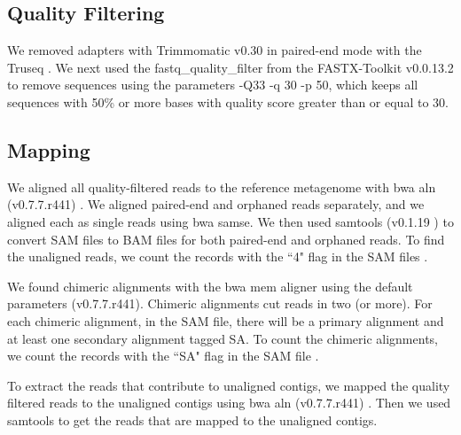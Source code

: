 \subsection*{Quality Filtering} 

We removed adapters with Trimmomatic v0.30 in paired-end mode with the
Truseq \cite{trim}.
We next used the fastq\_quality\_filter %
from the FASTX-Toolkit v0.0.13.2 \cite{FXtoolkit} to remove sequences  %
using the parameters -Q33 -q 30 -p 50, which keeps all sequences with 50\% or more bases with quality score greater than or equal to 30. %


\subsection*{Mapping}

We aligned all quality-filtered reads to the reference metagenome with bwa
aln (v0.7.7.r441) \cite{bwa}. %
  We aligned paired-end and orphaned reads separately,
and we aligned each as single reads using bwa samse.  We then used
 samtools (v0.1.19 ) \cite{sam-stools} to convert SAM files to BAM files for both
paired-end and orphaned reads. To find the unaligned reads, we count the records with the ``4" flag in the SAM files \cite{sam-stools}. 

We found chimeric alignments with the bwa mem aligner using the
default parameters (v0.7.7.r441).  Chimeric alignments cut reads in
two (or more).  For each chimeric alignment, in the SAM file, there
will be a primary alignment and at least one secondary alignment
tagged SA.  To count the chimeric alignments, we count the records
with the ``SA" flag in the SAM file \cite{sam-stools}. 

To extract the reads that contribute to unaligned contigs, we mapped the quality filtered reads to the unaligned contigs using bwa aln (v0.7.7.r441) \cite{bwa}. 
Then we used samtools \cite{sam-stools} to get the reads that are mapped to the unaligned contigs. 


